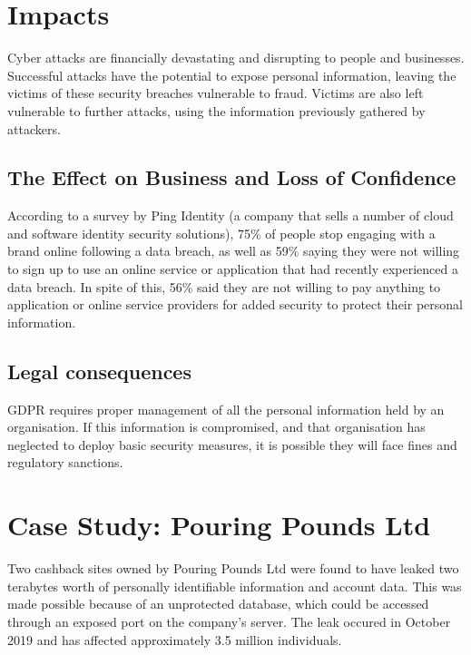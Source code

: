\section{Impacts}
    Cyber attacks are financially devastating and disrupting to people and businesses. Successful attacks have the potential to expose personal information, leaving the victims of these security breaches vulnerable to fraud. \cite{CyberCrime} Victims are also left vulnerable to further attacks, using the information previously gathered by attackers.
        
    \subsection{The Effect on Business and Loss of Confidence}
        According to a survey by Ping Identity (a company that sells a number of cloud and software identity security solutions), 75\% of people stop engaging with a brand online following a data breach, as well as 59\% saying they were not willing to sign up to use an online service or application that had recently experienced a data breach. \cite{ITGovernance} In spite of this, 56\% said they are not willing to pay anything to application or online service providers for added security to protect their personal information. \cite{ITGovernance}

    \subsection{Legal consequences}
        GDPR requires proper management of all the personal information held by an organisation. \cite{BusinessInfo} If this information is compromised, and that organisation has neglected to deploy basic security measures, it is possible they will face fines and regulatory sanctions. \cite{BusinessInfo}


\section{Case Study: Pouring Pounds Ltd}
    Two cashback sites owned by Pouring Pounds Ltd were found to have leaked two terabytes worth of personally identifiable information and account data. This was made possible because of an unprotected database, which could be accessed through an exposed port on the company's server. The leak occured in October 2019 and has affected approximately 3.5 million individuals. \cite{z6mag}